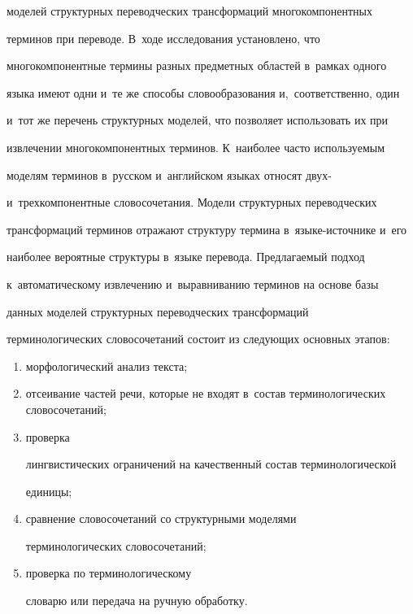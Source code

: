 моделей структурных переводческих трансформаций многокомпонентных 


терминов при переводе. В~ходе исследования установлено, что 


многокомпонентные термины разных предметных об\-ластей в~рамках одного 


языка имеют одни и~те же способы словообразования и,~соответственно, один 


и~тот же перечень структурных моделей, что позволяет использовать их при 


извлечении многокомпонентных терминов. К~наиболее часто используемым 


моделям терминов в~русском и~английском языках относят двух- 


и~трехкомпонентные словосочетания. Модели структурных переводческих 


трансформаций терминов отражают структуру термина в~язы\-ке-ис\-точ\-ни\-ке и~его 


наиболее вероятные структуры в~языке перевода. Предлагаемый подход 


к~автоматическому извлечению и~выравниванию терминов на основе базы 


данных моделей структурных переводческих трансформаций 


терминологических словосочетаний состоит из следующих основных этапов: 


\begin{enumerate}[(1)]


\item морфологический анализ текста; 


\item отсеивание частей речи, которые не входят в~состав терминологических словосочетаний; 


\item проверка 


лингвистических ограничений на качественный состав терминологической 


единицы; 


\item сравнение словосочетаний со структурными моделями 


терминологических словосочетаний; 


\item проверка по терминологическому 


словарю или передача на ручную об\-ра\-ботку.


\end{enumerate}











